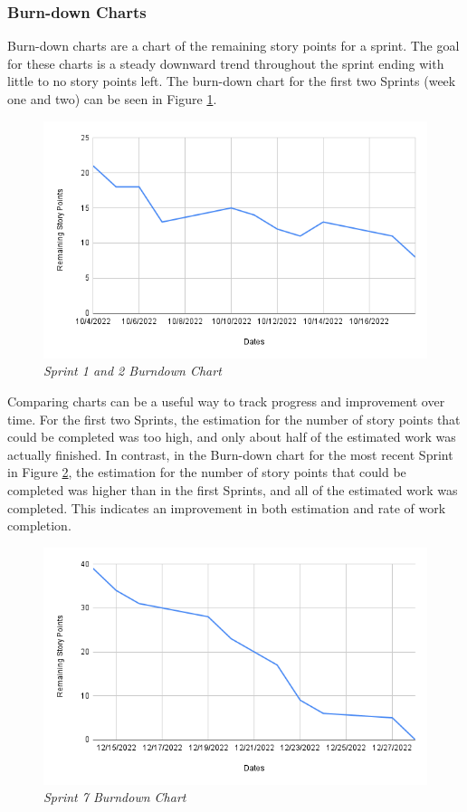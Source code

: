 \documentclass{article}
\begin{document}
\subsubsection{Burn-down Charts} \label{bdc}
Burn-down charts are a chart of the remaining story points for a sprint. The goal for these charts is a steady downward trend throughout the sprint ending with little to no story points left. The burn-down chart for the first two Sprints (week one and two) can be seen in Figure \ref{s1ands2bd}.

\begin{figure}[H]
    \centering
    \includegraphics[width=120mm]{methodology/s1and2bd.png}
    \caption{\emph{Sprint 1 and 2 Burndown Chart}}
    \label{s1ands2bd}
\end{figure}


Comparing charts can be a useful way to track progress and improvement over time. For the first two Sprints, the estimation for the number of story points that could be completed was too high, and only about half of the estimated work was actually finished. In contrast, in the Burn-down chart for the most recent Sprint in Figure \ref{s7bd}, the estimation for the number of story points that could be completed was higher than in the first Sprints, and all of the estimated work was completed. This indicates an improvement in both estimation and rate of work completion. 

\begin{figure}[H]
    \centering
    \includegraphics[width=120mm]{methodology/s7bd.png}
    \caption{\emph{Sprint 7 Burndown Chart}}
    \label{s7bd}
\end{figure}
\end{document}
